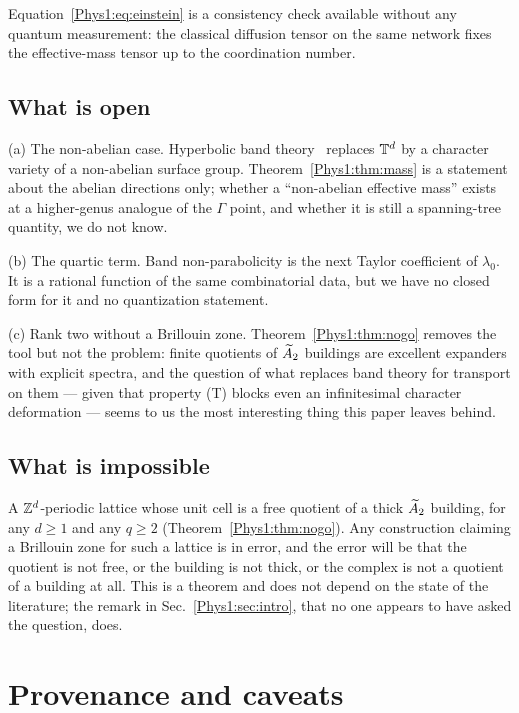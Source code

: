 Equation~\eqref{Phys1:eq:einstein} is a consistency check available without any quantum
measurement: the classical diffusion tensor on the same network fixes the effective-mass
tensor up to the coordination number.

\subsection{What is open}

(a) The non-abelian case. Hyperbolic band theory~\cite{MR1,MR2} replaces $\mathbb{T}^{d}$ by a
character variety of a non-abelian surface group. Theorem~\ref{Phys1:thm:mass} is a statement
about the abelian directions only; whether a ``non-abelian effective mass'' exists at a
higher-genus analogue of the $\Gamma$ point, and whether it is still a spanning-tree
quantity, we do not know.

(b) The quartic term. Band non-parabolicity is the next Taylor coefficient of
$\lambda_0$. It is a rational function of the same combinatorial data, but we have no
closed form for it and no quantization statement.

(c) Rank two without a Brillouin zone. Theorem~\ref{Phys1:thm:nogo} removes the tool but not the
problem: finite quotients of $\widetilde A_2$ buildings are excellent expanders with explicit
spectra, and the question of what replaces band theory for transport on them --- given that
property (T) blocks even an infinitesimal character deformation --- seems to us the most
interesting thing this paper leaves behind.

\subsection{What is impossible}

A $\mathbb{Z}^{d}$-periodic lattice whose unit cell is a free quotient of a thick $\widetilde A_2$ building,
for any $d\ge1$ and any $q\ge2$ (Theorem~\ref{Phys1:thm:nogo}). Any construction claiming a
Brillouin zone for such a lattice is in error, and the error will be that the quotient is
not free, or the building is not thick, or the complex is not a quotient of a building at
all. This is a theorem and does not depend on the state of the literature; the remark in
Sec.~\ref{Phys1:sec:intro}, that no one appears to have asked the question, does.

\section*{Provenance and caveats}

